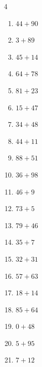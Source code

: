 \begin{multicols}{4}
\begin{enumerate}
  \item $44+90$
        \phantom{$=134$}

  \item $3+89$
        \phantom{$=92$}

  \item $45+14$
        \phantom{$=59$}

  \item $64+78$
        \phantom{$=142$}

  \item $81+23$
        \phantom{$=104$}

  \item $15+47$
        \phantom{$=62$}

  \item $34+48$
        \phantom{$=82$}

  \item $44+11$
        \phantom{$=55$}

\columnbreak %

\resetques

  \item $88+51$
        \phantom{$=139$}

  \item $36+98$
        \phantom{$=134$}

  \item $46+9$
        \phantom{$=55$}

  \item $73+5$
        \phantom{$=78$}

  \item $79+46$
        \phantom{$=125$}

  \item $35+7$
        \phantom{$=42$}

  \item $32+31$
        \phantom{$=63$}

  \item $57+63$
        \phantom{$=120$}

  \item $18+14$
        \phantom{$=32$}

  \item $85+64$
        \phantom{$=149$}

  \item $0+48$
        \phantom{$=48$}

  \item $5+95$
        \phantom{$=100$}

  \item $7+12$
        \phantom{$=19$}


\end{enumerate}
\end{multicols}
